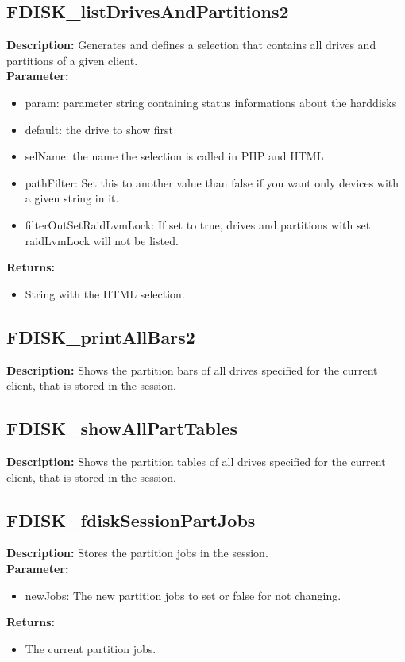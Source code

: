 \subsection{FDISK\_listDrivesAndPartitions2}
\textbf{Description:} Generates and defines a selection that contains all drives and partitions of a given client.\\
\textbf{Parameter:}
\begin{itemize}
\item param: parameter string containing status informations about the harddisks
\item default: the drive to show first
\item selName: the name the selection is called in PHP and HTML
\item pathFilter: Set this to another value than false if you want only devices with a given string in it.
\item filterOutSetRaidLvmLock: If set to true, drives and partitions with set raidLvmLock will not be listed.
\end{itemize}
\textbf{Returns:}
\begin{itemize}
\item String with the HTML selection.
\end{itemize}

\subsection{FDISK\_printAllBars2}
\textbf{Description:} Shows the partition bars of all drives specified for the current client, that is stored in the session.\\

\subsection{FDISK\_showAllPartTables}
\textbf{Description:} Shows the partition tables of all drives specified for the current client, that is stored in the session.\\

\subsection{FDISK\_fdiskSessionPartJobs}
\textbf{Description:} Stores the partition jobs in the session.\\
\textbf{Parameter:}
\begin{itemize}
\item newJobs: The new partition jobs to set or false for not changing.
\end{itemize}
\textbf{Returns:}
\begin{itemize}
\item The current partition jobs.
\end{itemize}

